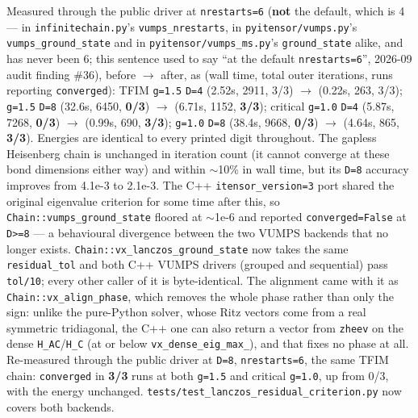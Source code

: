 \documentclass[11pt]{article}
\begin{document}
Measured through the public driver at \texttt{nrestarts=6}
(\textbf{not} the default, which is 4 --- in \texttt{infinitechain.py}'s
\texttt{vumps\_nrestarts}, in \texttt{pyitensor/vumps.py}'s
\texttt{vumps\_ground\_state} and in \texttt{pyitensor/vumps\_ms.py}'s
\texttt{ground\_state} alike, and has never been 6; this sentence used to
say ``at the default \texttt{nrestarts=6}'', 2026-09 audit finding \#36),
before $\to$ after, as (wall time, total outer iterations, runs reporting
\texttt{converged}): TFIM \texttt{g=1.5} \texttt{D=4} (2.52s, 2911, 3/3)
$\to$ (0.22s, 263, 3/3); \texttt{g=1.5} \texttt{D=8} (32.6s, 6450,
\textbf{0/3}) $\to$ (6.71s, 1152, \textbf{3/3}); critical \texttt{g=1.0}
\texttt{D=4} (5.87s, 7268, \textbf{0/3}) $\to$ (0.99s, 690,
\textbf{3/3}); \texttt{g=1.0} \texttt{D=8} (38.4s, 9668, \textbf{0/3})
$\to$ (4.64s, 865, \textbf{3/3}). Energies are identical to every printed
digit throughout. The gapless Heisenberg chain is unchanged in iteration
count (it cannot converge at these bond dimensions either way) and within
$\sim$10\% in wall time, but its \texttt{D=8} accuracy improves from
4.1e-3 to 2.1e-3. The C++ \texttt{itensor\_version=3} port shared the
original eigenvalue criterion for some time after this, so
\texttt{Chain::vumps\_ground\_state} floored at $\sim$1e-6 and reported
\texttt{converged=False} at \texttt{D>=8} --- a behavioural divergence
between the two VUMPS backends that no longer exists.
\texttt{Chain::vx\_lanczos\_ground\_state} now takes the same
\texttt{residual\_tol} and both C++ VUMPS drivers (grouped and sequential)
pass \texttt{tol/10}; every other caller of it is byte-identical. The
alignment came with it as \texttt{Chain::vx\_align\_phase}, which removes
the whole phase rather than only the sign: unlike the pure-Python solver,
whose Ritz vectors come from a real symmetric tridiagonal, the C++ one can
also return a vector from \texttt{zheev} on the dense
\texttt{H\_AC}/\texttt{H\_C} (at or below \texttt{vx\_dense\_eig\_max\_}),
and that fixes no phase at all. Re-measured through the public driver at
\texttt{D=8}, \texttt{nrestarts=6}, the same TFIM chain: \texttt{converged}
in \textbf{3/3} runs at both \texttt{g=1.5} and critical \texttt{g=1.0}, up
from 0/3, with the energy unchanged.
\texttt{tests/test\_lanczos\_residual\_criterion.py} now covers both
backends.
\end{document}
